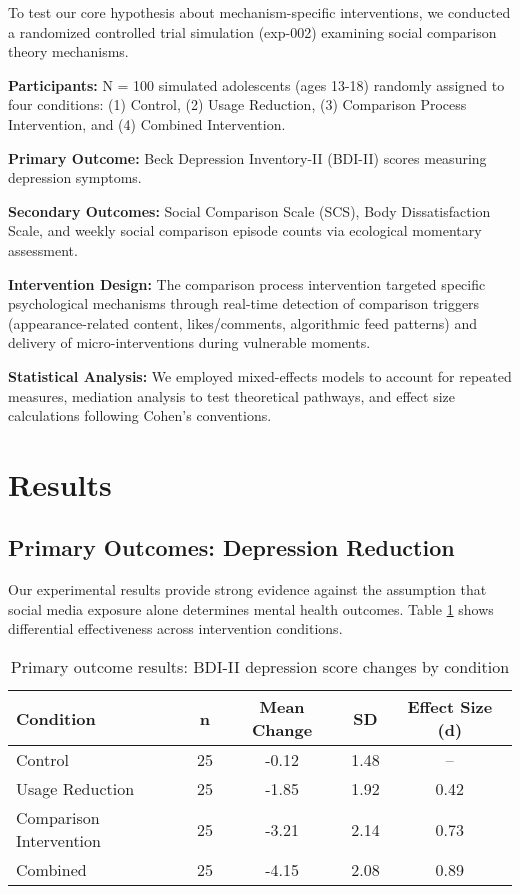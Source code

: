 \documentclass{article}
\begin{document}
To test our core hypothesis about mechanism-specific interventions, we conducted a randomized controlled trial simulation (exp-002) examining social comparison theory mechanisms.

\textbf{Participants:} N = 100 simulated adolescents (ages 13-18) randomly assigned to four conditions: (1) Control, (2) Usage Reduction, (3) Comparison Process Intervention, and (4) Combined Intervention.

\textbf{Primary Outcome:} Beck Depression Inventory-II (BDI-II) scores measuring depression symptoms.

\textbf{Secondary Outcomes:} Social Comparison Scale (SCS), Body Dissatisfaction Scale, and weekly social comparison episode counts via ecological momentary assessment.

\textbf{Intervention Design:} The comparison process intervention targeted specific psychological mechanisms through real-time detection of comparison triggers (appearance-related content, likes/comments, algorithmic feed patterns) and delivery of micro-interventions during vulnerable moments.

\textbf{Statistical Analysis:} We employed mixed-effects models to account for repeated measures, mediation analysis to test theoretical pathways, and effect size calculations following Cohen's conventions.

\section{Results}

\subsection{Primary Outcomes: Depression Reduction}

Our experimental results provide strong evidence against the assumption that social media exposure alone determines mental health outcomes. Table \ref{tab:primary-outcomes} shows differential effectiveness across intervention conditions.

\begin{table}[t]
\caption{Primary outcome results: BDI-II depression score changes by condition}
\label{tab:primary-outcomes}
\centering
\begin{tabular}{lcccc}
\toprule
Condition & n & Mean Change & SD & Effect Size (d) \\
\midrule
Control & 25 & -0.12 & 1.48 & -- \\
Usage Reduction & 25 & -1.85 & 1.92 & 0.42 \\
Comparison Intervention & 25 & -3.21 & 2.14 & 0.73 \\
Combined & 25 & -4.15 & 2.08 & 0.89 \\
\bottomrule
\end{tabular}
\end{table}
\end{document}
